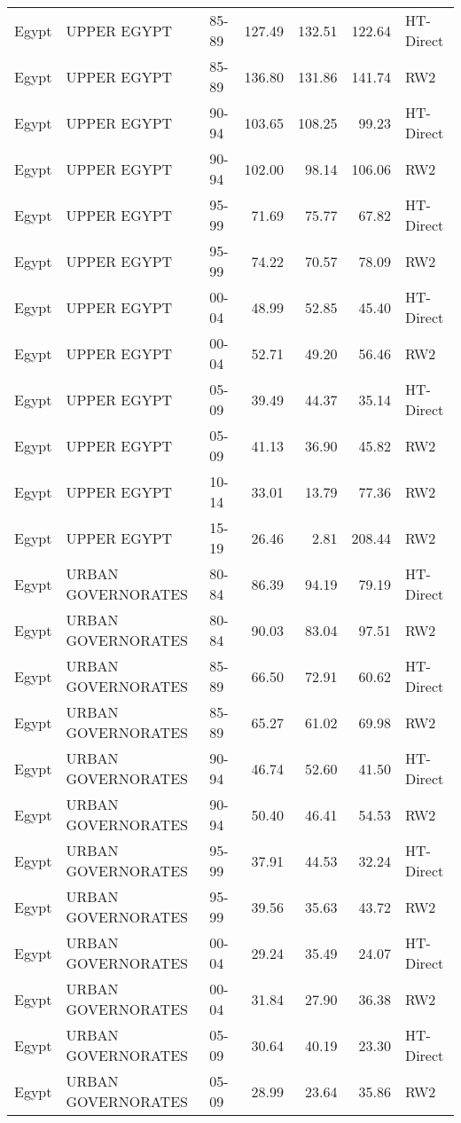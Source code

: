 \begin{longtable}{lllrrrl}
  Egypt & UPPER EGYPT & 85-89 & 127.49 & 132.51 & 122.64 & HT-Direct \\ 
  Egypt & UPPER EGYPT & 85-89 & 136.80 & 131.86 & 141.74 & RW2 \\ 
  Egypt & UPPER EGYPT & 90-94 & 103.65 & 108.25 & 99.23 & HT-Direct \\ 
  Egypt & UPPER EGYPT & 90-94 & 102.00 & 98.14 & 106.06 & RW2 \\ 
  Egypt & UPPER EGYPT & 95-99 & 71.69 & 75.77 & 67.82 & HT-Direct \\ 
  Egypt & UPPER EGYPT & 95-99 & 74.22 & 70.57 & 78.09 & RW2 \\ 
  Egypt & UPPER EGYPT & 00-04 & 48.99 & 52.85 & 45.40 & HT-Direct \\ 
  Egypt & UPPER EGYPT & 00-04 & 52.71 & 49.20 & 56.46 & RW2 \\ 
  Egypt & UPPER EGYPT & 05-09 & 39.49 & 44.37 & 35.14 & HT-Direct \\ 
  Egypt & UPPER EGYPT & 05-09 & 41.13 & 36.90 & 45.82 & RW2 \\ 
  Egypt & UPPER EGYPT & 10-14 & 33.01 & 13.79 & 77.36 & RW2 \\ 
  Egypt & UPPER EGYPT & 15-19 & 26.46 & 2.81 & 208.44 & RW2 \\ 
  Egypt & URBAN GOVERNORATES & 80-84 & 86.39 & 94.19 & 79.19 & HT-Direct \\ 
  Egypt & URBAN GOVERNORATES & 80-84 & 90.03 & 83.04 & 97.51 & RW2 \\ 
  Egypt & URBAN GOVERNORATES & 85-89 & 66.50 & 72.91 & 60.62 & HT-Direct \\ 
  Egypt & URBAN GOVERNORATES & 85-89 & 65.27 & 61.02 & 69.98 & RW2 \\ 
  Egypt & URBAN GOVERNORATES & 90-94 & 46.74 & 52.60 & 41.50 & HT-Direct \\ 
  Egypt & URBAN GOVERNORATES & 90-94 & 50.40 & 46.41 & 54.53 & RW2 \\ 
  Egypt & URBAN GOVERNORATES & 95-99 & 37.91 & 44.53 & 32.24 & HT-Direct \\ 
  Egypt & URBAN GOVERNORATES & 95-99 & 39.56 & 35.63 & 43.72 & RW2 \\ 
  Egypt & URBAN GOVERNORATES & 00-04 & 29.24 & 35.49 & 24.07 & HT-Direct \\ 
  Egypt & URBAN GOVERNORATES & 00-04 & 31.84 & 27.90 & 36.38 & RW2 \\ 
  Egypt & URBAN GOVERNORATES & 05-09 & 30.64 & 40.19 & 23.30 & HT-Direct \\ 
  Egypt & URBAN GOVERNORATES & 05-09 & 28.99 & 23.64 & 35.86 & RW2 \\ 

\end{longtable}
